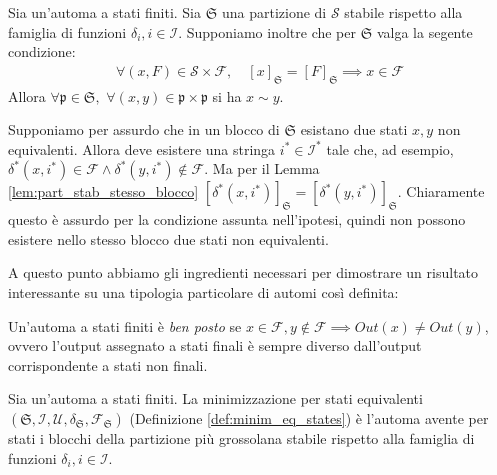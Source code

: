 \begin{lemma}
    \label{lem:part_stab_equiv}
    Sia \automata un'automa a stati finiti. Sia $\mathfrak{S}$ una partizione di $\mathcal{S}$ stabile rispetto alla famiglia di funzioni $\delta_i, i \in \mathcal{I}$. Supponiamo inoltre che per $\mathfrak{S}$ valga la segente condizione:
    \begin{gather*}
        \forall (x,F) \in \mathcal{S} \times \mathcal{F}, \quad [x]_{\mathfrak{S}} = [F]_{\mathfrak{S}} \implies x \in \mathcal{F}
    \end{gather*}
    Allora $\forall \mathfrak{p} \in \mathfrak{S}, \,\,\forall (x,y) \in \mathfrak{p} \times \mathfrak{p}$ si ha $x \sim y$.
\end{lemma}
\begin{proof2}
    Supponiamo per assurdo che in un blocco di $\mathfrak{S}$ esistano due stati $x,y$ non equivalenti. Allora deve esistere una stringa $i^* \in \mathcal{I}^*$ tale che, ad esempio, $\delta^*(x,i^*) \in \mathcal{F} \land \delta^*(y,i^*) \not\in \mathcal{F}$. Ma per il Lemma \ref{lem:part_stab_stesso_blocco} $[\delta^*(x,i^*)]_{\mathfrak{S}} = [\delta^*(y,i^*)]_{\mathfrak{S}}$. Chiaramente questo è assurdo per la condizione assunta nell'ipotesi, quindi non possono esistere nello stesso blocco due stati non equivalenti.
\end{proof2}
A questo punto abbiamo gli ingredienti necessari per dimostrare un risultato interessante su una tipologia particolare di automi così definita:
\begin{definition}
    \label{def:automi_ben_posti}
    Un'automa a stati finiti \automata è \emph{ben posto} se $x \in \mathcal{F}, y \not\in \mathcal{F} \implies Out(x) \neq Out(y)$, ovvero l'output assegnato a stati finali è sempre diverso dall'output corrispondente a stati non finali.
\end{definition}
\begin{theorem}
    \label{theo:auto_mini_rscp}
    Sia \automata un'automa a stati finiti. La minimizzazione per stati equivalenti $(\mathfrak{S}, \mathcal{I}, \mathcal{U}, \delta_\mathfrak{S}, \mathcal{F}_\mathfrak{S})$ (Definizione \ref{def:minim_eq_states}) è l'automa avente per stati i blocchi della partizione più grossolana stabile rispetto alla famiglia di funzioni $\delta_i, i \in \mathcal{I}$.
\end{theorem}
